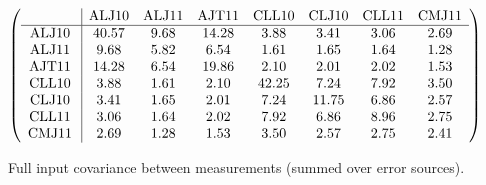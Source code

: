 \begin{table}[H]
\scriptsize
\begin{center}
\renewcommand{\arraystretch}{1.1}
\begin{math}\left(\begin{array}{c|ccccccc}
 & \mathrm{ALJ10} & 
\mathrm{ALJ11} & 
\mathrm{AJT11} & 
\mathrm{CLL10} & 
\mathrm{CLJ10} & 
\mathrm{CLL11} & 
\mathrm{CMJ11} \\
\hline
\mathrm{ALJ10} \hspace*{2pt} &      40.57 &       9.68 &      14.28 &       3.88 &       3.41 &       3.06 &       2.69 \\
\mathrm{ALJ11} \hspace*{2pt} &       9.68 &       5.82 &       6.54 &       1.61 &       1.65 &       1.64 &       1.28 \\
\mathrm{AJT11} \hspace*{2pt} &      14.28 &       6.54 &      19.86 &       2.10 &       2.01 &       2.02 &       1.53 \\
\mathrm{CLL10} \hspace*{2pt} &       3.88 &       1.61 &       2.10 &      42.25 &       7.24 &       7.92 &       3.50 \\
\mathrm{CLJ10} \hspace*{2pt} &       3.41 &       1.65 &       2.01 &       7.24 &      11.75 &       6.86 &       2.57 \\
\mathrm{CLL11} \hspace*{2pt} &       3.06 &       1.64 &       2.02 &       7.92 &       6.86 &       8.96 &       2.75 \\
\mathrm{CMJ11} \hspace*{2pt} &       2.69 &       1.28 &       1.53 &       3.50 &       2.57 &       2.75 &       2.41 \\
\end{array}\right)\end{math}
\caption{Full input covariance between measurements (summed over error sources).}
\renewcommand{\arraystretch}{1}
\end{center}
\end{table}
